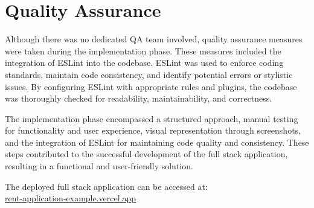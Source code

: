\section{Quality Assurance}
Although there was no dedicated QA team involved, quality assurance measures were taken during the implementation phase. These measures included the integration of ESLint into the codebase. ESLint was used to enforce coding standards, maintain code consistency, and identify potential errors or stylistic issues. By configuring ESLint with appropriate rules and plugins, the codebase was thoroughly checked for readability, maintainability, and correctness.

The implementation phase encompassed a structured approach, manual testing for functionality and user experience, visual representation through screenshots, and the integration of ESLint for maintaining code quality and consistency. These steps contributed to the successful development of the full stack application, resulting in a functional and user-friendly solution.

The deployed full stack application can be accessed at:\\ \href{https://rent-application-example.vercel.app/}{\underline{rent-application-example.vercel.app}}